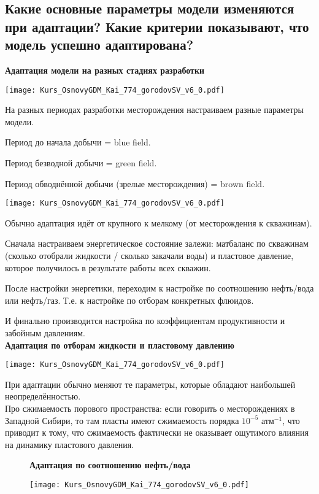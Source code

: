 

\subsection{Какие основные параметры модели изменяются при адаптации? Какие критерии показывают, что модель успешно адаптирована?}

\textbf{Адаптация модели на разных стадиях разработки}

\texttt{[image: Kurs\_OsnovyGDM\_Kai\_774\_gorodovSV\_v6\_0.pdf]}

На разных периодах разработки месторождения настраиваем разные параметры модели.

Период до начала добычи = blue field.

Период безводной добычи = green field.

Период обводнённой добычи (зрелые месторождения) = brown field.

\texttt{[image: Kurs\_OsnovyGDM\_Kai\_774\_gorodovSV\_v6\_0.pdf]}

Обычно адаптация идёт от крупного к мелкому (от месторождения к скважинам).

Сначала настраиваем энергетическое состояние залежи: матбаланс по скважинам (сколько отобрали жидкости / сколько закачали воды) и пластовое давление, которое получилось в результате работы всех скважин.

После настройки энергетики, переходим к настройке по соотношению нефть/вода или нефть/газ.
Т.е. к настройке по отборам конкретных флюидов.

И финально производится настройка по коэффициентам продуктивности и забойным давлениям.
\\

\textbf{Адаптация по отборам жидкости и пластовому давлению}

\texttt{[image: Kurs\_OsnovyGDM\_Kai\_774\_gorodovSV\_v6\_0.pdf]}

При адаптации обычно меняют те параметры, которые обладают наибольшей неопределённостью.
\\

Про сжимаемость порового пространства: если говорить о месторождениях в Западной Сибири, то там пласты имеют сжимаемость порядка $10^{-5} \text{ атм}^{-1}$, что приводит к тому, что сжимаемость фактически не оказывает ощутимого влияния на динамику пластового давления.

\begin{figure}[H]
\textbf{Адаптация по соотношению нефть/вода}

\texttt{[image: Kurs\_OsnovyGDM\_Kai\_774\_gorodovSV\_v6\_0.pdf]}
\end{figure}


